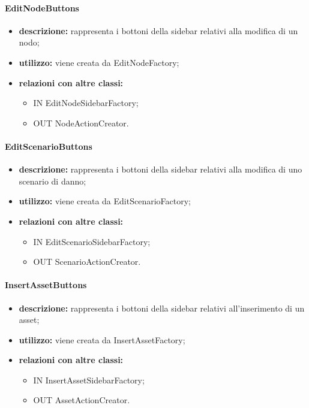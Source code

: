 \paragraph{EditNodeButtons}
\begin{itemize}
	\item \textbf{descrizione:} rappresenta i bottoni della sidebar relativi alla modifica di un nodo;
	\item \textbf{utilizzo:} viene creata da EditNodeFactory;
	\item \textbf{relazioni con altre classi:} 
	\begin{itemize}
		\item IN EditNodeSidebarFactory;
		\item OUT NodeActionCreator.
	\end{itemize}
\end{itemize}
\paragraph{EditScenarioButtons}
\begin{itemize}
	\item \textbf{descrizione:} rappresenta i bottoni della sidebar relativi alla modifica di uno scenario di danno;
	\item \textbf{utilizzo:} viene creata da EditScenarioFactory;
	\item \textbf{relazioni con altre classi:} 
	\begin{itemize}
		\item IN EditScenarioSidebarFactory;
		\item OUT ScenarioActionCreator.
	\end{itemize}
\end{itemize}
\paragraph{InsertAssetButtons}
\begin{itemize}
	\item \textbf{descrizione:} rappresenta i bottoni della sidebar relativi all'inserimento di un asset;
	\item \textbf{utilizzo:} viene creata da InsertAssetFactory;
	\item \textbf{relazioni con altre classi:} 
	\begin{itemize}
		\item IN InsertAssetSidebarFactory;
		\item OUT AssetActionCreator.
	\end{itemize}
\end{itemize}
